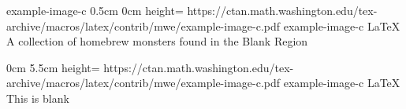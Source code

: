 \documentclass[letterpaper,openany,twoside,twocolumn]{book}
\begin{document}
		{example-image-c}%
		{0.5cm}%
		{0cm}%
		{height=\paperheight}%
		{https://ctan.math.washington.edu/tex-archive/macros/latex/contrib/mwe/example-image-c.pdf}%
		{example-image-c}%
		{LaTeX}%
		{A collection of homebrew monsters found in the Blank Region}%
	
	\tableofcontents
	
	\mainmatter
	
	
	
		{0cm}%
		{5.5cm}%
		{height=\paperheight}%
		{https://ctan.math.washington.edu/tex-archive/macros/latex/contrib/mwe/example-image-c.pdf}%
		{example-image-c}%
		{LaTeX}%
		{This is blank}%
\end{document}
